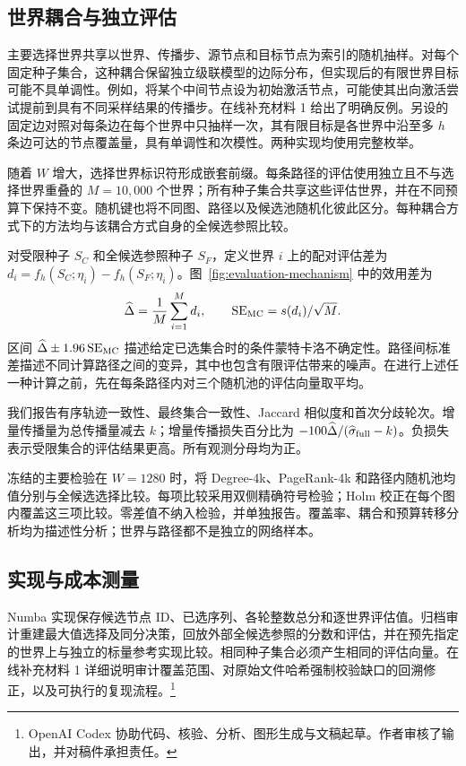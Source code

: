\documentclass[smallextended]{svjour3}
\begin{document}
\subsection{世界耦合与独立评估}\label{sec:coupling}
主要选择世界共享以世界、传播步、源节点和目标节点为索引的随机抽样。对每个固定种子集合，这种耦合保留独立级联模型的边际分布，但实现后的有限世界目标可能不具单调性。例如，将某个中间节点设为初始激活节点，可能使其出向激活尝试提前到具有不同采样结果的传播步。在线补充材料 1 给出了明确反例。另设的固定边对照对每条边在每个世界中只抽样一次，其有限目标是各世界中沿至多 $h$ 条边可达的节点覆盖量，具有单调性和次模性。两种实现均使用完整枚举。

随着 $W$ 增大，选择世界标识符形成嵌套前缀。每条路径的评估使用独立且不与选择世界重叠的 $M=10,000$ 个世界；所有种子集合共享这些评估世界，并在不同预算下保持不变。随机键也将不同图、路径以及候选池随机化彼此区分。每种耦合方式下的方法均与该耦合方式自身的全候选参照比较。

对受限种子 $S_C$ 和全候选参照种子 $S_F$，定义世界 $i$ 上的配对评估差为 $d_i=f_h(S_C;\eta_i)-f_h(S_F;\eta_i)$。图~\ref{fig:evaluation-mechanism} 中的效用差为
\begin{equation}
\widehat\Delta=\frac{1}{M}\sum_{i=1}^{M}d_i,
\qquad \operatorname{SE}_{\rm MC}=s(d_i)/\sqrt M.
\end{equation}
区间 $\widehat\Delta\pm1.96\operatorname{SE}_{\rm MC}$ 描述给定已选集合时的条件蒙特卡洛不确定性。路径间标准差描述不同计算路径之间的变异，其中也包含有限评估带来的噪声。在进行上述任一种计算之前，先在每条路径内对三个随机池的评估向量取平均。

我们报告有序轨迹一致性、最终集合一致性、Jaccard 相似度和首次分歧轮次。增量传播量为总传播量减去 $k$；增量传播损失百分比为 $-100\widehat\Delta/(\widehat\sigma_{\rm full}-k)$。负损失表示受限集合的评估结果更高。所有观测分母均为正。

冻结的主要检验在 $W=1280$ 时，将 Degree-4k、PageRank-4k 和路径内随机池均值分别与全候选选择比较。每项比较采用双侧精确符号检验；Holm 校正在每个图内覆盖这三项比较。零差值不纳入检验，并单独报告。覆盖率、耦合和预算转移分析均为描述性分析；世界与路径都不是独立的网络样本。

\subsection{实现与成本测量}
Numba 实现保存候选节点 ID、已选序列、各轮整数总分和逐世界评估值。归档审计重建最大值选择及同分决策，回放外部全候选参照的分数和评估，并在预先指定的世界上与独立的标量参考实现比较。相同种子集合必须产生相同的评估向量。在线补充材料 1 详细说明审计覆盖范围、对原始文件哈希强制校验缺口的回溯修正，以及可执行的复现流程。\footnote{OpenAI Codex 协助代码、核验、分析、图形生成与文稿起草。作者审核了输出，并对稿件承担责任。}
\end{document}
